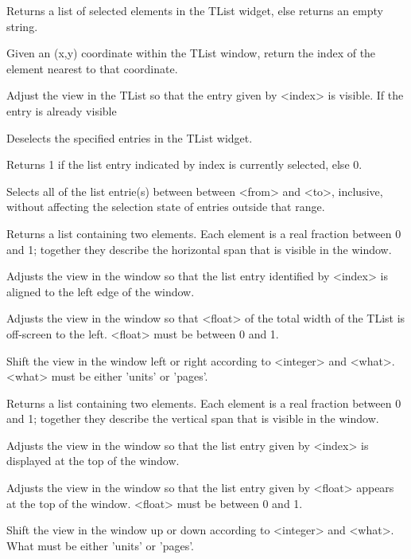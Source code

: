 \begin{enum}{1cm}
Returns a list of selected elements in the
TList widget, else returns an empty string.

Given an (x,y) coordinate within the TList window,
return the index of the element
nearest to that coordinate.

Adjust the view in the TList so that the entry given
by <index> is visible. If the entry is already visible

Deselects the specified entries in the TList widget.

Returns 1 if the list entry indicated by index
is currently selected, else 0.

Selects all of the list entrie(s) between
between <from> and <to>, inclusive, without
affecting the selection state of entries
outside that range.

Returns a list containing two elements.  Each
element is a real fraction between 0 and 1;
together they describe the horizontal span
that is visible in the window.

Adjusts the view in the window so that the
list entry identified by <index> is aligned to
the left edge of the window.

Adjusts the view in the window so that
<float> of the total width of the TList is
off-screen to the left. <float> must be
between 0 and 1.

Shift the view in the window
left or right according to <integer> and <what>.
<what> must be either 'units' or 'pages'.

Returns a list containing two elements.  Each
element is a real fraction between 0 and 1;
together they describe the vertical span
that is visible in the window.

Adjusts the view in the window so that the
list entry given by <index> is displayed at the
top of the window.

Adjusts the view in the window so that the
list entry given by <float> appears at the
top of the window. <float> must be between 0 and 1.

Shift the view in the window up or down according to <integer> and <what>.
What must be either 'units' or 'pages'.

\end{enum}

